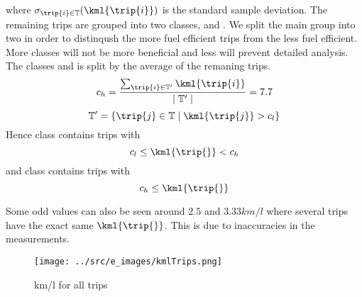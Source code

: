 where $\sigma_{\trip{i}\in \mathbb{T}}(\kml{\trip{i}})$ is the standard sample deviation.
The remaining trips are grouped into two classes, \fuelMedium and \fuelHigh.
We split the main group into two in order to distinqush the more fuel efficient trips from the less fuel efficient.
More classes will not be more beneficial and less will prevent detailed analysis. %
The classes \fuelMedium and \fuelHigh is split by the average  of the remaning trips.
\[c_h = \frac{\sum_{\trip{i}\in \mathbb{T'}}\kml{\trip{i}}}{\mid \mathbb{T'}\mid} = 7.7\]%
\[\mathbb{T}' = \{\trip{j}\in \mathbb{T}\mid \kml{\trip{j}} > c_l\}\]
Hence class \fuelMedium contains trips with
\[c_l \leq \kml{\trip{}} < c_h\]
and class \fuelHigh contains trips with
\[c_h \leq \kml{\trip{}}\]
 

Some odd values can also be seen around $2.5$ and $3.33 km/l$ where several trips have the exact same $\kml{\trip{}}$.
This is due to inaccuracies in the measurements.

\begin{figure}[htb]
\centering
\texttt{[image: ../src/e\_images/kmlTrips.png]}
\caption{km/l for all trips}
\label{fig:kmlTrips}
\end{figure}

